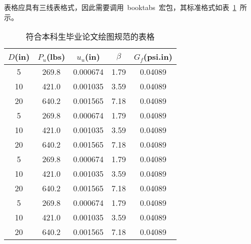 表格应具有三线表格式，因此需要调用~booktabs~宏包，其标准格式如表~\ref{tab:table1}~所示。
\begin{table}[htbp]
\caption{符合本科生毕业论文绘图规范的表格}\label{tab:table1}
\vspace{0.5em}\centering\wuhao
\begin{tabular}{ccccc}
\toprule[1.5pt]
$D$(in) & $P_u$(lbs) & $u_u$(in) & $\beta$ & $G_f$(psi.in)\\
\midrule[1pt]
 5 & 269.8 & 0.000674 & 1.79 & 0.04089\\
10 & 421.0 & 0.001035 & 3.59 & 0.04089\\
20 & 640.2 & 0.001565 & 7.18 & 0.04089\\
 5 & 269.8 & 0.000674 & 1.79 & 0.04089\\
10 & 421.0 & 0.001035 & 3.59 & 0.04089\\
20 & 640.2 & 0.001565 & 7.18 & 0.04089\\
 5 & 269.8 & 0.000674 & 1.79 & 0.04089\\
10 & 421.0 & 0.001035 & 3.59 & 0.04089\\
20 & 640.2 & 0.001565 & 7.18 & 0.04089\\
 5 & 269.8 & 0.000674 & 1.79 & 0.04089\\
10 & 421.0 & 0.001035 & 3.59 & 0.04089\\
20 & 640.2 & 0.001565 & 7.18 & 0.04089\\
\bottomrule[1.5pt]
\end{tabular}
\vspace{\baselineskip}
\end{table}


